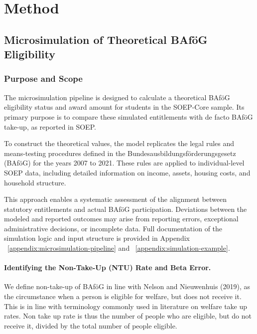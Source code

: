 
\section{Method} 


\subsection{Microsimulation of Theoretical BAföG Eligibility} 
\subsubsection{Purpose and Scope}
The microsimulation pipeline is designed to calculate a theoretical BAföG eligibility status and award amount for students in the SOEP-Core sample. 
Its primary purpose is to compare these simulated entitlements with de facto BAföG take-up, as reported in SOEP.

To construct the theoretical values, the model replicates the legal rules and means-testing procedures defined in the Bundesausbildungsförderungsgesetz (BAföG) for the years 2007 to 2021. 
These rules are applied to individual-level SOEP data, including detailed information on income, assets, housing costs, and household structure.

This approach enables a systematic assessment of the alignment between statutory entitlements and actual BAföG participation. 
Deviations between the modeled and reported outcomes may arise from reporting errors, exceptional administrative decisions, or incomplete data. 
Full documentation of the simulation logic and input structure is provided in Appendix ~\ref{appendix:microsimulation-pipeline} and ~\ref{appendix:simulation-example}.

\paragraph{Identifying the Non-Take-Up (NTU) Rate and Beta Error.} %
We define non-take-up of BAföG in line with Nelson and Nieuwenhuis (2019), as the circumstance when a person is eligible for welfare, but does not receive it. This is in line with terminology commonly used in literature on welfare take up rates. Non take up rate is thus the number of people who are eligible, but do not receive it, divided by the total number of people eligible. 


